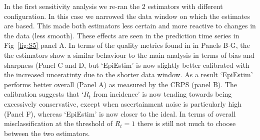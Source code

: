\documentclass[a4paper, 12pt, twoside]{article}
\begin{document}
In the first sensitivity analysis we re-ran the 2 estimators with different configuration. In this case we narrowed the data window on which the estimates are based. This made both estimators less certain and more reactive to changes in the data (less smooth). These effects are seen in the prediction time series in Fig~\ref{fig:S5} panel A. In terms of the quality metrics found in in Panels B-G, the the estimators show a similar behaviour to the main analysis in terms of bias and sharpness (Panel C and D, but `EpiEstim' is now slightly better calibrated with the increased unceratinty due to the shorter data window. As a result `EpiEstim' performs better overall (Panel A) as measured by the CRPS (panel B). The calibration suggests that `$R_t$ from incidence' is now tending towards being excessively conservative, except when ascertainment noise is particularly high (Panel F), whereas `EpiEstim' is now closer to the ideal. In terms of overall misclassification at the threshold of $R_t=1$ there is still not much to choose between the two estimators.
\end{document}

